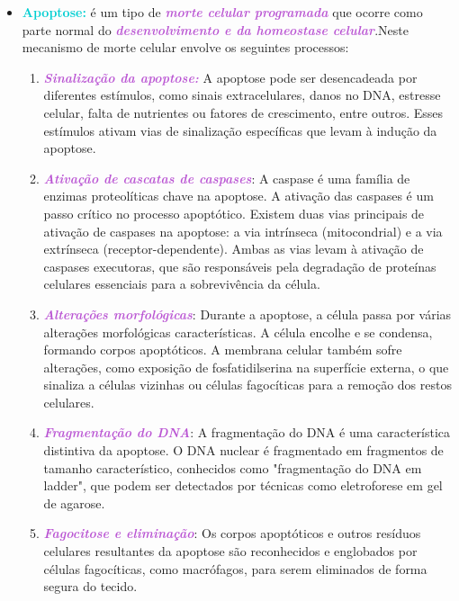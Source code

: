 \documentclass[11pt,a4paper]{article}
\begin{document}
	\begin{itemize}
		\item \textcolor{DarkTurquoise}{\textbf{Apoptose:}}  é um tipo de \textcolor{MediumOrchid}{\textbf{\textit{morte celular programada}}} que ocorre como parte normal do \textcolor{MediumOrchid}{\textbf{\textit{desenvolvimento e da homeostase celular}}}.Neste mecanismo de morte celular envolve os seguintes processos:
		\begin{enumerate}
			\item \textcolor{MediumOrchid}{\textbf{\textit{Sinalização da apoptose:}}} A apoptose pode ser desencadeada por diferentes estímulos, como sinais extracelulares, danos no DNA, estresse celular, falta de nutrientes ou fatores de crescimento, entre outros. Esses estímulos ativam vias de sinalização específicas que levam à indução da apoptose.
			\item \textcolor{MediumOrchid}{\textbf{\textit{Ativação de cascatas de caspases}}}: A caspase é uma família de enzimas proteolíticas chave na apoptose. A ativação das caspases é um passo crítico no processo apoptótico. Existem duas vias principais de ativação de caspases na apoptose: a via intrínseca (mitocondrial) e a via extrínseca (receptor-dependente). Ambas as vias levam à ativação de caspases executoras, que são responsáveis pela degradação de proteínas celulares essenciais para a sobrevivência da célula.
			\item \textcolor{MediumOrchid}{\textbf{\textit{Alterações morfológicas}}}: Durante a apoptose, a célula passa por várias alterações morfológicas características. A célula encolhe e se condensa, formando corpos apoptóticos. A membrana celular também sofre alterações, como exposição de fosfatidilserina na superfície externa, o que sinaliza a células vizinhas ou células fagocíticas para a remoção dos restos celulares.
			\item \textcolor{MediumOrchid}{\textbf{\textit{Fragmentação do DNA}}}: A fragmentação do DNA é uma característica distintiva da apoptose. O DNA nuclear é fragmentado em fragmentos de tamanho característico, conhecidos como "fragmentação do DNA em ladder", que podem ser detectados por técnicas como eletroforese em gel de agarose.
			\item \textcolor{MediumOrchid}{\textbf{\textit{Fagocitose e eliminação}}}: Os corpos apoptóticos e outros resíduos celulares resultantes da apoptose são reconhecidos e englobados por células fagocíticas, como macrófagos, para serem eliminados de forma segura do tecido.
		\end{enumerate}


\end{itemize}
\end{document}
